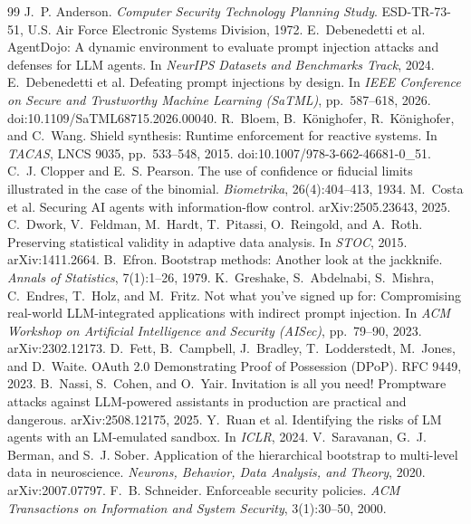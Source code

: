\documentclass[11pt]{article}
\begin{document}
\begin{thebibliography}{99}\small
{} J.~P. Anderson. \emph{Computer Security Technology Planning Study}. ESD-TR-73-51, U.S. Air Force Electronic Systems Division, 1972.
 E.~Debenedetti et al. AgentDojo: A dynamic environment to evaluate prompt injection attacks and defenses for LLM agents. In \emph{NeurIPS Datasets and Benchmarks Track}, 2024.
 E.~Debenedetti et al. Defeating prompt injections by design. In \emph{IEEE Conference on Secure and Trustworthy Machine Learning (SaTML)}, pp.~587--618, 2026. doi:10.1109/SaTML68715.2026.00040.
 R.~Bloem, B.~K{\"o}nighofer, R.~K{\"o}nighofer, and C.~Wang. Shield synthesis: Runtime enforcement for reactive systems. In \emph{TACAS}, LNCS 9035, pp.~533--548, 2015. doi:10.1007/978-3-662-46681-0\_51.
 C.~J. Clopper and E.~S. Pearson. The use of confidence or fiducial limits illustrated in the case of the binomial. \emph{Biometrika}, 26(4):404--413, 1934.
 M.~Costa et al. Securing AI agents with information-flow control. arXiv:2505.23643, 2025.
 C.~Dwork, V.~Feldman, M.~Hardt, T.~Pitassi, O.~Reingold, and A.~Roth. Preserving statistical validity in adaptive data analysis. In \emph{STOC}, 2015. arXiv:1411.2664.
 B.~Efron. Bootstrap methods: Another look at the jackknife. \emph{Annals of Statistics}, 7(1):1--26, 1979.
 K.~Greshake, S.~Abdelnabi, S.~Mishra, C.~Endres, T.~Holz, and M.~Fritz. Not what you've signed up for: Compromising real-world LLM-integrated applications with indirect prompt injection. In \emph{ACM Workshop on Artificial Intelligence and Security (AISec)}, pp.~79--90, 2023. arXiv:2302.12173.
 D.~Fett, B.~Campbell, J.~Bradley, T.~Lodderstedt, M.~Jones, and D.~Waite. OAuth 2.0 Demonstrating Proof of Possession (DPoP). RFC 9449, 2023.
 B.~Nassi, S.~Cohen, and O.~Yair. Invitation is all you need! Promptware attacks against LLM-powered assistants in production are practical and dangerous. arXiv:2508.12175, 2025.
 Y.~Ruan et al. Identifying the risks of LM agents with an LM-emulated sandbox. In \emph{ICLR}, 2024.
 V.~Saravanan, G.~J. Berman, and S.~J. Sober. Application of the hierarchical bootstrap to multi-level data in neuroscience. \emph{Neurons, Behavior, Data Analysis, and Theory}, 2020. arXiv:2007.07797.
 F.~B. Schneider. Enforceable security policies. \emph{ACM Transactions on Information and System Security}, 3(1):30--50, 2000.

\end{thebibliography}
\end{document}

